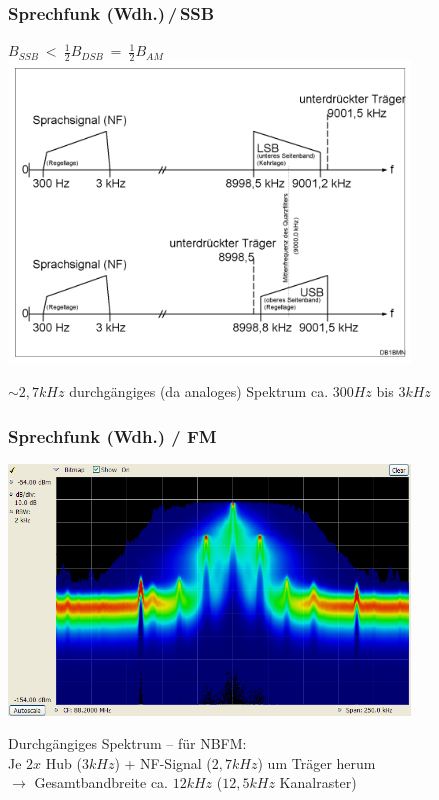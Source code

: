 \begin{frame}
    \frametitle{Sprechfunk (Wdh.)\,/\,SSB}


    \begin{center}
        $B_{SSB} ~ < ~ \frac{1}{2} B_{DSB} ~ = ~ \frac{1}{2} B_{AM}$ \\
        \includegraphics[width=0.8\textwidth,height=.65\textheight,keepaspectratio]{e16/Ssb-de.png}
        \tiny \hyperlink{refs}{\cite{wc}}
    \end{center}

    \centering
    $\sim 2,7 kHz$ durchgängiges (da analoges) Spektrum ca. $300 Hz$ bis $3 kHz$

\end{frame}

\begin{frame}
    \frametitle{Sprechfunk (Wdh.) / FM}

    \begin{center}
        \includegraphics[width=0.8\textwidth,height=.55\textheight,keepaspectratio]{e16/Dpx-fm-radio.png}
        \tiny \hyperlink{refs}{\cite{wc}}
    \end{center}

    \centering Durchgängiges Spektrum -- für NBFM: \\
    Je $2x$ Hub ($3 kHz$) + NF-Signal ($2,7 kHz$) um Träger herum \\[1em]
    
    $\rightarrow$ Gesamtbandbreite ca. $12 kHz$ ($12,5 kHz$ Kanalraster)

\end{frame}

